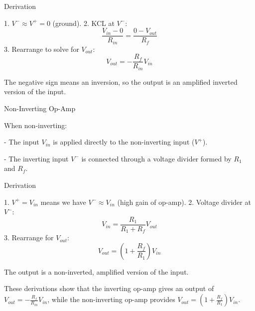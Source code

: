 \documentclass[12pt]{article}
\begin{document}
Derivation

1. \( V^- \approx V^+ = 0 \) (ground).
2. KCL at \( V^- \):
   \[
   \frac{V_{in} - 0}{R_{in}} = \frac{0 - V_{out}}{R_f}
   \]
3. Rearrange to solve for \( V_{out} \):
   \[
   V_{out} = -\frac{R_f}{R_{in}} V_{in}
   \]

The negative sign means an inversion, so the output is an amplified inverted version of the input.

Non-Inverting Op-Amp

When non-inverting:

- The input \( V_{in} \) is applied directly to the non-inverting input (\( V^+ \)).

- The inverting input \( V^- \) is connected through a voltage divider formed by \( R_1 \) and \( R_f \).

Derivation

1. \( V^+ = V_{in} \) means we have \( V^- \approx V_{in} \) (high gain of op-amp).
2. Voltage divider at \( V^- \):
   \[
   V_{in} = \frac{R_1}{R_1 + R_f} V_{out}
   \]
3. Rearrange for \( V_{out} \):
   \[
   V_{out} = \left(1 + \frac{R_f}{R_1}\right) V_{in}
   \]

The output is a non-inverted, amplified version of the input.

These derivations show that the inverting op-amp gives an output of \( V_{out} = -\frac{R_f}{R_{in}} V_{in} \), 
while the non-inverting op-amp provides \( V_{out} = \left(1 + \frac{R_f}{R_1}\right) V_{in} \).
\end{document}
